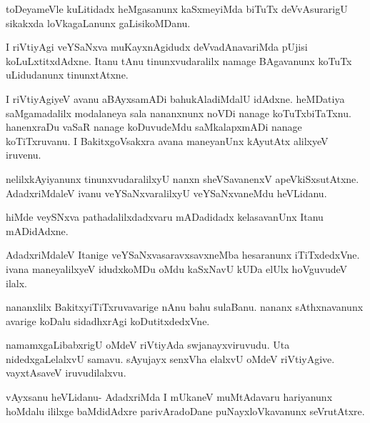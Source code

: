 \documentclass{article}
\begin{document}
\begin{mng}%
toDeyameVle kuLitidadx heMgasanunx kaSxmeyiMda biTuTx deVvAsurarigU 
sikakxda loVkagaLanunx gaLisikoMDanu.
\end{mng}

\begin{mng}%
I riVtiyAgi veYSaNxva muKayxnAgidudx deVvadAnavariMda pUjisi
koLuLxtitxdAdxne. Itanu tAnu tinunxvudaralilx namage BAgavanunx koTuTx
uLidudanunx tinunxtAtxne.
\end{mng}

\begin{mng}%
I riVtiyAgiyeV avanu aBAyxsamADi bahukAladiMdalU
idAdxne. heMDatiya saMgamadalilx modalaneya sala nananxnunx noVDi nanage
koTuTxbiTaTxnu. hanenxraDu vaSaR nanage koDuvudeMdu saMkalapxmADi nanage
koTiTxruvanu. I BakitxgoVsakxra avana maneyanUnx kAyutAtx alilxyeV
iruvenu.
\end{mng}

\begin{mng}%
nelilxkAyiyanunx tinunxvudaralilxyU nanxn sheVSavanenxV apeVkiSxsutAtxne.
AdadxriMdaleV ivanu veYSaNxvaralilxyU veYSaNxvaneMdu heVLidanu.
\end{mng}

\begin{mng}%
hiMde veySNxva pathadalilxdadxvaru mADadidadx kelasavanUnx Itanu mADidAdxne.
\end{mng}

\begin{mng}%
AdadxriMdaleV Itanige veYSaNxvasaravxsavxneMba hesaranunx iTiTxdedxVne.
ivana maneyalilxyeV idudxkoMDu oMdu kaSxNavU kUDa elUlx hoVguvudeV
ilalx.
\end{mng}

\begin{mng}%
nananxlilx BakitxyiTiTxruvavarige nAnu bahu sulaBanu. nananx
sAthxnavanunx avarige koDalu sidadhxrAgi koDutitxdedxVne.
\end{mng}

\begin{mng}%
namamxgaLibabxrigU oMdeV riVtiyAda swjanayxviruvudu. Uta
nidedxgaLelalxvU samavu. sAyujayx senxVha elalxvU oMdeV riVtiyAgive. vayxtAsaveV
iruvudilalxvu.
\end{mng}

\begin{mng}%
vAyxsanu heVLidanu- AdadxriMda I mUkaneV muMtAdavaru
hariyanunx hoMdalu ililxge baMdidAdxre parivAradoDane puNayxloVkavanunx
seVrutAtxre.
\end{mng}
\end{document}
